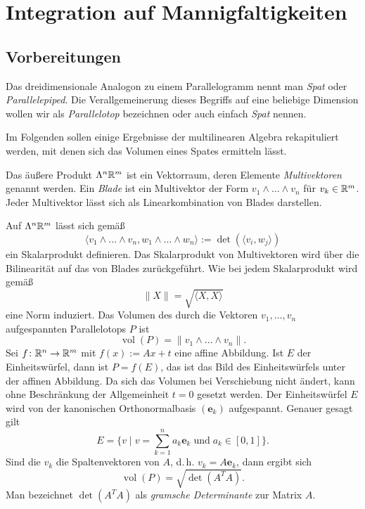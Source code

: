 
\chapter{Integration auf Mannigfaltigkeiten}

\section{Vorbereitungen}

Das dreidimensionale Analogon zu einem Parallelogramm nennt man
\emph{Spat} oder \emph{Parallelepiped}. Die
Verallgemeinerung dieses Begriffs auf eine beliebige Dimension wollen
wir als \emph{Parallelotop}
bezeichnen oder auch einfach \emph{Spat} nennen. 

Im Folgenden sollen einige Ergebnisse der multilinearen Algebra
rekapituliert werden, mit denen sich das Volumen eines Spates ermitteln
lässt.

Das äußere Produkt $\Lambda^n \mathbb R^m$ ist ein Vektorraum, deren Elemente
\emph{Multivektoren} genannt werden. Ein
\emph{Blade} ist ein Multivektor der Form
$v_1\wedge\ldots\wedge v_n$ für $v_k\in\mathbb R^m$. Jeder Multivektor lässt
sich als Linearkombination von Blades darstellen.

Auf $\Lambda^n\mathbb R^m$ lässt sich gemäß
\begin{equation}
\langle v_1\wedge\ldots\wedge v_n,w_1\wedge\ldots\wedge w_n\rangle
:= \det(\langle v_i,w_j\rangle)
\end{equation}
ein Skalarprodukt definieren. Das Skalarprodukt von Multivektoren
wird über die Bilinearität auf das von Blades zurückgeführt. Wie
bei jedem Skalarprodukt wird gemäß
\begin{equation}
\|X\| = \sqrt{\langle X,X\rangle}
\end{equation}
eine Norm induziert. Das Volumen des durch die Vektoren $v_1,\ldots,v_n$
aufgespannten Parallelotops $P$ ist
\begin{equation}\label{eq:vol}
\operatorname{vol}(P) = \|v_1\wedge\ldots\wedge v_n\|.
\end{equation}
Sei $f\colon\mathbb R^n\to\mathbb R^m$ mit $f(x):=Ax+t$ eine affine Abbildung.
Ist $E$ der Einheitswürfel, dann ist $P=f(E)$, das ist das Bild des
Einheitswürfels unter der affinen Abbildung. Da sich das Volumen
bei Verschiebung nicht ändert, kann ohne Beschränkung der Allgemeinheit
$t=0$ gesetzt werden. Der Einheitswürfel $E$ wird von der kanonischen
Orthonormalbasis $(\mathbf e_k)$ aufgespannt. Genauer gesagt gilt
\begin{equation}\textstyle
E = \{v\mid v = \sum_{k=1}^n a_k\mathbf e_k\;\text{und}\;a_k\in [0,1]\}.
\end{equation}
Sind die $v_k$ die Spaltenvektoren von $A$, d.\,h. $v_k = A\mathbf e_k$,
dann ergibt sich
\begin{equation}\label{eq:vol-gram}
\operatorname{vol}(P) = \sqrt{\det(A^T A)}.
\end{equation}
Man bezeichnet $\det(A^T A)$ als
\emph{gramsche Determinante}
zur Matrix $A$.

